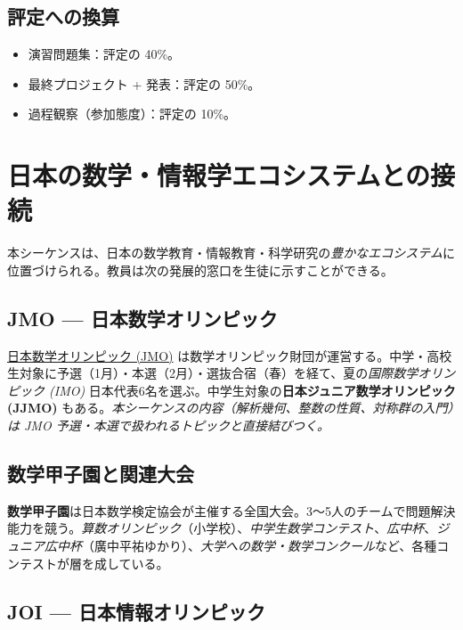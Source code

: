 \documentclass[12pt,a4paper]{scrartcl}
\newcommand{\acc}[1]{\textcolor{accent}{\textbf{#1}}}
\begin{document}
\subsection{評定への換算}
\begin{itemize}[leftmargin=1.3em,itemsep=0.1em,topsep=0.2em,nosep]
  \item 演習問題集：評定の 40\%。
  \item 最終プロジェクト + 発表：評定の 50\%。
  \item 過程観察（参加態度）：評定の 10\%。
\end{itemize}

\section{日本の数学・情報学エコシステムとの接続}\label{sec:jmo}

本シーケンスは、日本の数学教育・情報教育・科学研究の\emph{豊かなエコシステム}に位置づけられる。教員は次の発展的窓口を生徒に示すことができる。

\subsection{JMO --- 日本数学オリンピック}

\href{https://www.imojp.org/}{日本数学オリンピック (JMO)} は数学オリンピック財団が運営する。中学・高校生対象に予選（1月）・本選（2月）・選抜合宿（春）を経て、夏の\emph{国際数学オリンピック (IMO)} 日本代表6名を選ぶ。中学生対象の\acc{日本ジュニア数学オリンピック (JJMO)} もある。\emph{本シーケンスの内容（解析幾何、整数の性質、対称群の入門）は JMO 予選・本選で扱われるトピックと直接結びつく。}

\subsection{数学甲子園と関連大会}

\acc{数学甲子園}は日本数学検定協会が主催する全国大会。3〜5人のチームで問題解決能力を競う。\emph{算数オリンピック}（小学校）、\emph{中学生数学コンテスト}、\emph{広中杯}、\emph{ジュニア広中杯}（廣中平祐ゆかり）、\emph{大学への数学・数学コンクール}など、各種コンテストが層を成している。

\subsection{JOI --- 日本情報オリンピック}
\end{document}
